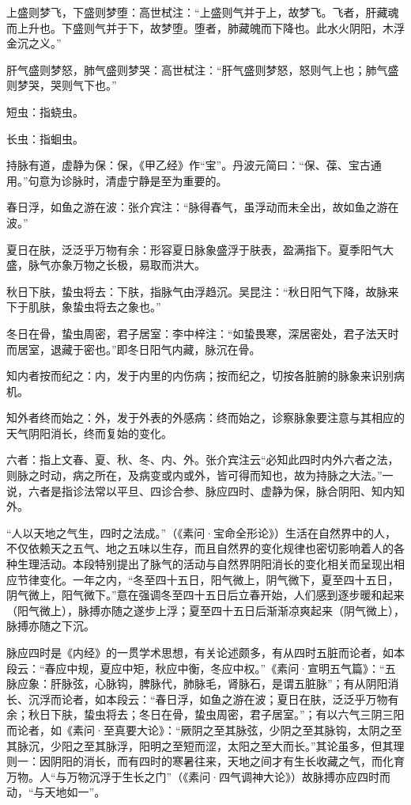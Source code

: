 \documentclass[12pt]{ctexbook}
\begin{document}
\begin{jiaozhu}
  \item 上盛则梦飞，下盛则梦堕：高世栻注：“上盛则气并于上，故梦飞。飞者，肝藏魂而上升也。下盛则气并于下，故梦堕。堕者，肺藏魄而下降也。此水火阴阳，木浮金沉之义。”
  \item 肝气盛则梦怒，肺气盛则梦哭：高世栻注：“肝气盛则梦怒，怒则气上也；肺气盛则梦哭，哭则气下也。”
  \item 短虫：指蛲虫。
  \item 长虫：指蛔虫。
  \item 持脉有道，虚静为保：保，《甲乙经》作“宝”。丹波元简曰：“保、葆、宝古通用。”句意为诊脉时，清虚宁静是至为重要的。
  \item 春日浮，如鱼之游在波：张介宾注：“脉得春气，虽浮动而未全出，故如鱼之游在波。”
  \item 夏日在肤，泛泛乎万物有余：形容夏日脉象盛浮于肤表，盈满指下。夏季阳气大盛，脉气亦象万物之长极，易取而洪大。
  \item 秋日下肤，蛰虫将去：下肤，指脉气由浮趋沉。吴昆注：“秋日阳气下降，故脉来下于肌肤，象蛰虫将去之象也。”
  \item 冬日在骨，蛰虫周密，君子居室：李中梓注：“如蛰畏寒，深居密处，君子法天时而居室，退藏于密也。”即冬日阳气内藏，脉沉在骨。
  \item 知内者按而纪之：内，发于内里的内伤病；按而纪之，切按各脏腑的脉象来识别病机。
  \item 知外者终而始之：外，发于外表的外感病：终而始之，诊察脉象要注意与其相应的天气阴阳消长，终而复始的变化。
  \item 六者：指上文春、夏、秋、冬、内、外。张介宾注云“必知此四时内外六者之法，则脉之时动，病之所在，及病变或内或外，皆可得而知也，故为持脉之大法。”一说，六者是指诊法常以平旦、四诊合参、脉应四时、虚静为保，脉合阴阳、知内知外。
\end{jiaozhu}



“人以天地之气生，四时之法成。”（《素问·宝命全形论》）生活在自然界中的人，不仅依赖天之五气、地之五味以生存，而且自然界的变化规律也密切影响着人的各种生理活动。本段特别提出了脉气的活动与自然界阴阳消长的变化相关而呈现出相应节律变化。一年之内，“冬至四十五日，阳气微上，阴气微下，夏至四十五日，阴气微上，阳气微下。”意在强调冬至四十五日后立春开始，人们感到逐步暖和起来（阳气微上），脉搏亦随之遂步上浮；夏至四十五日后渐渐凉爽起来（阴气微上），脉搏亦随之下沉。

脉应四时是《内经》的一贯学术思想，有关论述颇多，有从四时五脏而论者，如本段云：“春应中规，夏应中矩，秋应中衡，冬应中权。”《素问·宣明五气篇》：“五脉应象：肝脉弦，心脉钩，脾脉代，肺脉毛，肾脉石，是谓五脏脉”；有从阴阳消长、沉浮而论者，如本段云：“春日浮，如鱼之游在波；夏日在肤，泛泛乎万物有余；秋日下肤，蛰虫将去；冬日在骨，蛰虫周密，君子居室。”；有以六气三阴三阳而论者，如《素问·至真要大论》：“厥阴之至其脉弦，少阴之至其脉钩，太阴之至其脉沉，少阳之至其脉浮，阳明之至短而涩，太阳之至大而长。”其论虽多，但其理则一：因阴阳的消长，而有四时的寒暑往来，天地之间才有生长收藏之气，而化育万物。人“与万物沉浮于生长之门”（《素问·四气调神大论》）故脉搏亦应四时而动，“与天地如一”。
\end{document}
